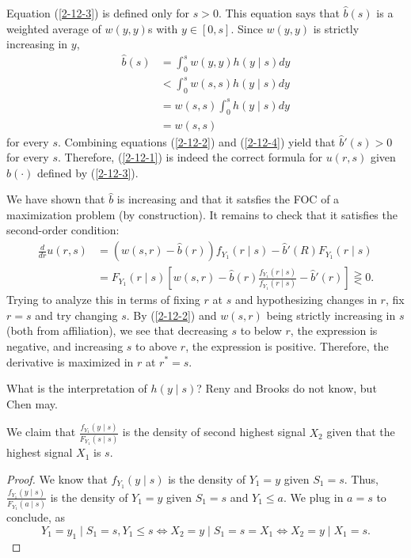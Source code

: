 Equation (\ref{2-12-3}) is defined only for $s > 0$.
This equation says that $\hat{b}(s)$ is a weighted average of $w(y,y)$s with $y \in [0,s]$.
Since $w(y,y)$ is strictly increasing in $y$,
\begin{equation}
	\begin{aligned}
		\hat{b}(s)
		&= \int_{0}^{s} w(y,y) h(y \mid s) dy \\
		&< \int_{0}^{s} w(s,s) h(y\mid s) dy \\
		&= w(s,s) \int_{0}^{s} h(y\mid s )dy \\
		&= w(s,s)
	\end{aligned}
	\label{2-12-4}
\end{equation} 
for every $s$. 
Combining equations (\ref{2-12-2}) and (\ref{2-12-4}) yield that $\hat{b}'(s) > 0$ for every $s$. Therefore, (\ref{2-12-1}) is indeed the correct formula for $u(r,s)$ given $\hat{b}(\cdot )$ defined by (\ref{2-12-3}).

We have shown that $\hat{b}$ is increasing and that it satsfies the FOC of a maximization problem (by construction). It remains to check that it satisfies the second-order condition:
\begin{align*}
	\frac{d}{dr} u(r,s) &= \left( w(s,r) - \hat{b}(r) \right)f_{Y_1}(r \mid s) - \hat{b}'(R) F_{Y_1}(r \mid s) \\
						&= F_{Y_1}(r \mid s) \left[ w(s,r) - \hat{b}(r) \frac{f_{Y_1}(r \mid s)}{f_{Y_1}(r \mid s)} - \hat{b}'(r) \right] \gtreqless 0
.\end{align*}
Trying to analyze this in terms of fixing $r$ at $s$ and hypothesizing changes in $r$, fix $r=s$ and try changing $s$. By (\ref{2-12-2}) and $w(s,r)$ being strictly increasing in $s$ (both from affiliation), we see that decreasing $s$ to below $r$, the expression is negative, and increasing $s$ to above $r$, the expression is positive. Therefore, the derivative is maximized in $r$ at $r^* = s$.

\begin{aside}	What is the interpretation of $h(y\mid s)$? Reny and Brooks do not know, but Chen may.
\end{aside}

\begin{proposition}	We claim that $\frac{f_{Y_1}(y\mid s)}{F_{Y_1}(s\mid s)}$ is the density of second highest signal $X_2$ given that the highest signal $X_1$ is $s$.
\end{proposition}
\begin{proof}
	We know that $f_{Y_1}(y\mid s)$ is the density of $Y_1= y$ given $S_1 = s$. Thus, $\frac{f_{Y_1}(y\mid s)}{F_{Y_1}(a \mid s)}$ is the density of $Y_1 = y$ given $S_1=s$ and $Y_1 \le a$.
	We plug in $a=s$ to conclude, as \[
		Y_1 = y_1 \mid S_1 = s, Y_1 \le s \iff X_2 = y \mid S_1 = s = X_1 \iff X_2 = y \mid X_1 = s
	.\] 
\end{proof}

